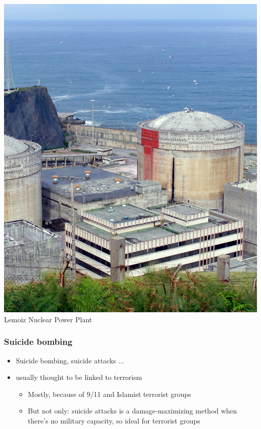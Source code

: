 \documentclass[aspectratio=43]{beamer}
\begin{document}
\begin{frame}
\begin{minipage}{0.49\textwidth}
\includegraphics[width = \textwidth]{img/lemoiz}\\
{\small Lemoiz Nuclear Power Plant}
\end{minipage}

\end{frame}

\begin{frame}
\frametitle{Suicide bombing}
\centering

\begin{itemize}
  \item Suicide bombing, suicide attacks ...
  \item[] usually thought to be linked to terrorism
  \begin{itemize}
    \item<2-> Mostly, because of 9/11 and Islamist terrorist groups
    \item<3-> But not only: suicide attacks is a damage-maximizing method when there's no military capacity, so ideal for terrorist groups
  \end{itemize}
\end{itemize}

\end{frame}
\end{document}
